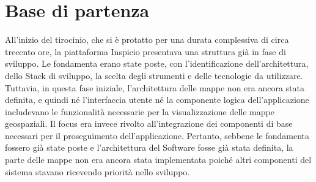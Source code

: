 \section{Base di partenza}
All'inizio del tirocinio, che si è protatto per una durata complessiva di circa trecento ore, la piattaforma Inspicio presentava una struttura già in fase di sviluppo. Le fondamenta erano state poste, con l'identificazione dell'architettura, dello Stack di sviluppo, la scelta degli strumenti e delle tecnologie da utilizzare.
Tuttavia, in questa fase iniziale, l'architettura delle mappe non era ancora stata definita, e quindi né l'interfaccia utente né la componente logica dell'applicazione includevano le funzionalità necessarie per la visualizzazione delle mappe geospaziali.
Il focus era invece rivolto all'integrazione dei componenti di base necessari per il proseguimento dell'applicazione.
Pertanto, sebbene le fondamenta fossero già state poste e l'architettura del Software fosse già stata definita, la parte delle mappe non era ancora stata implementata poiché altri componenti del sistema stavano ricevendo priorità nello sviluppo.


